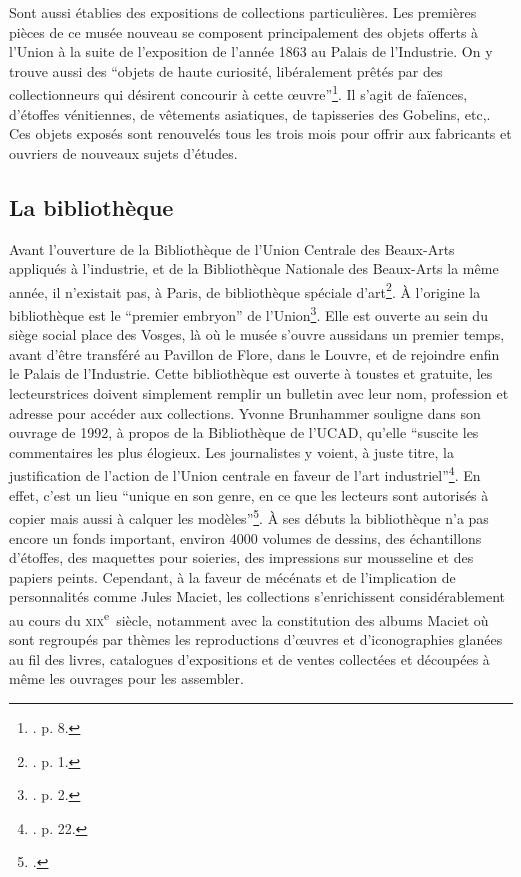 Sont aussi établies des expositions de collections particulières. Les premières pièces de ce musée nouveau se composent principalement des objets offerts à l'Union à la suite de l'exposition de l'année 1863 au Palais de l'Industrie. On y trouve aussi des \enquote{objets de haute curiosité, libéralement prêtés par des collectionneurs qui désirent concourir à cette œuvre}\footnote{\cite{noauthor_origines_nodate}. p. 8.}. Il s'agit de faïences, d'étoffes vénitiennes, de vêtements asiatiques, de tapisseries des Gobelins, etc,. Ces objets exposés sont renouvelés tous les trois mois pour offrir aux fabricants et ouvriers de nouveaux sujets d'études.

\subsection{La bibliothèque}

Avant l'ouverture de la Bibliothèque de l'Union Centrale des Beaux-Arts appliqués à l'industrie, et de la Bibliothèque Nationale des Beaux-Arts la même année, il n'existait pas, à Paris, de bibliothèque spéciale d'art\footnote{\cite{noauthor__1955}. p. 1.}. À l'origine la bibliothèque est le \enquote{premier embryon} de l'Union\footnote{\cite{noauthor__1991}. p. 2.}. Elle est ouverte au sein du siège social place des Vosges, là où le musée s'ouvre aussidans un premier temps, avant d'être transféré au Pavillon de Flore, dans le Louvre, et de rejoindre enfin le Palais de l'Industrie. Cette bibliothèque est ouverte à tous\wokisme tes et gratuite, les lecteurs\wokisme trices doivent simplement remplir un bulletin avec leur nom, profession et adresse pour accéder aux collections. Yvonne Brunhammer souligne dans son ouvrage de 1992, à propos de la Bibliothèque de l'UCAD, qu'elle \enquote{suscite les commentaires les plus élogieux. Les journalistes y voient, à juste titre, la justification de l'action de l'Union centrale en faveur de l'art industriel}\footnote{\cite{brunhammer_beau_1992}. p. 22.}. En effet, c'est un lieu \enquote{unique en son genre, en ce que les lecteurs sont autorisés à copier mais aussi à calquer les modèles}\footnote{\cite{noauthor__1874}.}. À ses débuts la bibliothèque n'a pas encore un fonds important, environ 4000 volumes de dessins, des échantillons d'étoffes, des maquettes pour soieries, des impressions sur mousseline et des papiers peints. Cependant, à la faveur de mécénats et de l'implication de personnalités comme Jules Maciet, les collections s'enrichissent considérablement au cours du \textsc{xix}\textsuperscript{e}~siècle, notamment avec la constitution des albums Maciet où sont regroupés par thèmes les reproductions d’œuvres et d'iconographies glanées au fil des livres, catalogues d'expositions et de ventes collectées et découpées à même les ouvrages pour les assembler.

